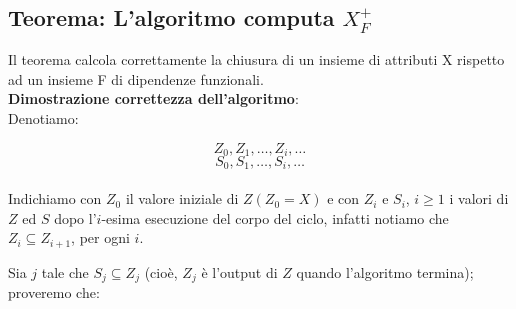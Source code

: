 \documentclass{article}
\begin{document}
\subsection{Teorema: L'algoritmo computa $X_{F}^{+}$}
Il teorema calcola correttamente la chiusura di un insieme di attributi X rispetto ad un insieme F di dipendenze funzionali.\\

\textbf{Dimostrazione correttezza dell'algoritmo}:\\

Denotiamo:\par

\[Z_{0}, Z_{1}, \dots, Z_{i}, \dots \]
\[S_{0}, S_{1}, \dots, S_{i}, \dots\]\\

Indichiamo con $Z_{0}$ il valore iniziale di $Z (Z_{0} = X)$ e con $Z_{i}$ e $S_{i}$, $i \geq 1$ i valori di $Z$ ed $S$ dopo l'$i$-esima esecuzione del corpo del ciclo, infatti notiamo che $Z_{i} \subseteq Z_{i+1}$, per ogni $i$.\par
Sia $j$ tale che $S_{j} \subseteq Z_{j}$ (cioè,  $Z_{j}$ è l'output di $Z$ quando l'algoritmo termina); proveremo che:
\end{document}
